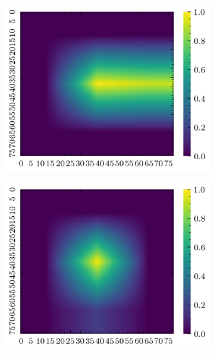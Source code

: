 \begin{figure}[H]
\begin{subfigure}[b]{0.19\textwidth}
        \includegraphics[width=\linewidth]{../img/5/quarry/false_negative/grad-cam-2d-2.png}
    \end{subfigure}
    \begin{subfigure}[b]{0.19\textwidth}
        \includegraphics[width=\linewidth]{../img/5/quarry/false_negative/grad-cam-2d-3.png}
    \end{subfigure}  
    \begin{subfigure}[b]{0.19\textwidth}

\end{subfigure}
\end{figure}
